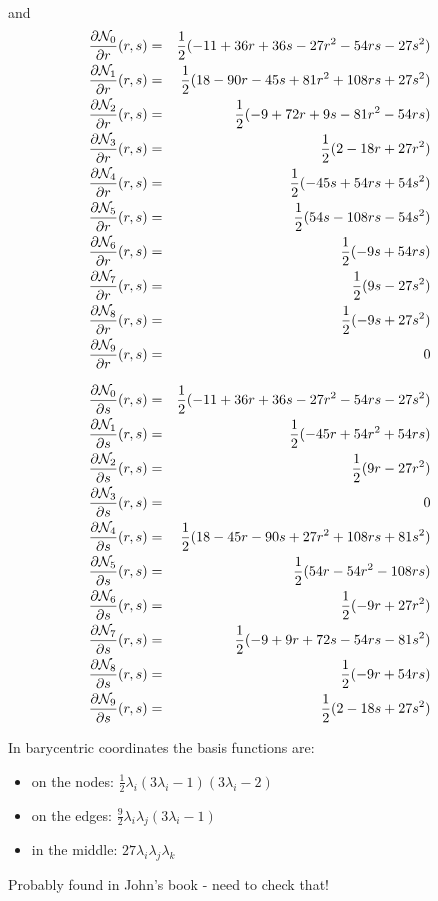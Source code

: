 and 
\begin{eqnarray}
\frac{\partial{\mathcal{N}}_0}{\partial r} (r,s) &=& \frac12(-11+36r+36s-27r^2-54rs-27s^2)   \nonumber\\
\frac{\partial{\mathcal{N}}_1}{\partial r} (r,s) &=& \frac12(18-90r-45s+81r^2+108rs+27s^2)   \nonumber\\
\frac{\partial{\mathcal{N}}_2}{\partial r} (r,s) &=& \frac12(-9+72r+9s-81r^2-54rs)   \nonumber\\
\frac{\partial{\mathcal{N}}_3}{\partial r} (r,s) &=& \frac12(2-18r+27r^2)   \nonumber\\
\frac{\partial{\mathcal{N}}_4}{\partial r} (r,s) &=& \frac12(-45s+54rs+54s^2)   \nonumber\\
\frac{\partial{\mathcal{N}}_5}{\partial r} (r,s) &=& \frac12(54s-108rs-54s^2) \nonumber\\
\frac{\partial{\mathcal{N}}_6}{\partial r} (r,s) &=& \frac12(-9s+54rs) \nonumber\\
\frac{\partial{\mathcal{N}}_7}{\partial r} (r,s) &=& \frac12(9s-27s^2) \nonumber\\
\frac{\partial{\mathcal{N}}_8}{\partial r} (r,s) &=& \frac12(-9s+27s^2)\nonumber\\
\frac{\partial{\mathcal{N}}_9}{\partial r} (r,s) &=&  0  \nonumber
\end{eqnarray}

\begin{eqnarray}
\frac{\partial{\mathcal{N}}_0}{\partial s} (r,s) &=& \frac12(-11+36r+36s-27r^2-54rs-27s^2)   \nonumber\\
\frac{\partial{\mathcal{N}}_1}{\partial s} (r,s) &=& \frac12(-45r+54r^2+54rs)   \nonumber\\
\frac{\partial{\mathcal{N}}_2}{\partial s} (r,s) &=& \frac12(9r-27r^2)   \nonumber\\
\frac{\partial{\mathcal{N}}_3}{\partial s} (r,s) &=& 0   \nonumber\\
\frac{\partial{\mathcal{N}}_4}{\partial s} (r,s) &=& \frac12(18-45r-90s+27r^2+108rs+81s^2)   \nonumber\\
\frac{\partial{\mathcal{N}}_5}{\partial s} (r,s) &=& \frac12(54r-54r^2-108rs)   \nonumber\\
\frac{\partial{\mathcal{N}}_6}{\partial s} (r,s) &=& \frac12(-9r+27r^2)   \nonumber\\
\frac{\partial{\mathcal{N}}_7}{\partial s} (r,s) &=& \frac12(-9+9r+72s-54rs-81s^2)   \nonumber\\
\frac{\partial{\mathcal{N}}_8}{\partial s} (r,s) &=& \frac12(-9r+54rs)   \nonumber\\
\frac{\partial{\mathcal{N}}_9}{\partial s} (r,s) &=& \frac12(2-18s+27s^2)   \nonumber
\end{eqnarray}


In barycentric coordinates the basis functions are:
\begin{itemize}
\item on the nodes: $\frac12\lambda_i (3\lambda_i-1)(3\lambda_i-2) $
\item on the edges: $\frac92 \lambda_i \lambda_j(3\lambda_i-1)$
\item in the middle: $27\lambda_i\lambda_j\lambda_k$
\end{itemize}

Probably found in John's book - need to check that!

















